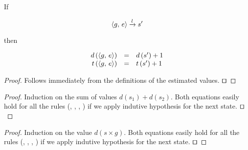 \begin{lemma}
\label{lem:task_measure_equations}
  If

  \[\langle g ,\, e \rangle \xrightarrow{l} s^\prime\]

  then

  \[
    \begin{array}{rcl}
    d\,(\langle g ,\, e \rangle) &=& d\,(s^\prime) + 1\\
    t\,(\langle g ,\, e \rangle) &=& t\,(s^\prime) + 1
    \end{array}
  \]
\end{lemma}
\begin{proof}
    Follows immediately from the definitions of the estimated values. $\qed$
\end{proof}


\begin{proof}
Induction on the sum of values $d(s_1) + d(s_2)$.
Both equations easily hold for all the rules (, , , ) if we apply indutive hypothesis for the next state. $\qed$
\end{proof}

\begin{proof}
Induction on the value $d(s \times g)$. 
Both equations easily hold for all the rules (, , , ) if we apply indutive hypothesis for the next state. $\qed$
\end{proof}

